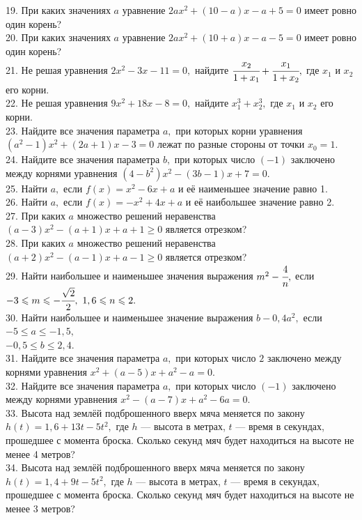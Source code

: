 \documentclass[12pt]{article}
\begin{document}
19. При каких значениях $a$ уравнение $2ax^2+(10-a)x-a+5=0$ имеет ровно один корень?\\
20. При каких значениях $a$ уравнение $2ax^2+(10+a)x-a-5=0$ имеет ровно один корень?\\
21. Не решая уравнения $2x^2-3x-11=0,$ найдите $\cfrac{x_2}{1+x_1}+\cfrac{x_1}{1+x_2},$ где $x_1$ и $x_2$ его корни.\\
22. Не решая уравнения $9x^2+18x-8=0,$ найдите $x_1^3+x_2^3,$ где $x_1$ и $x_2$ его корни.\\
23. Найдите все значения параметра $a,$ при которых корни уравнения $(a^2-1)x^2+(2a+1)x-3=0$ лежат по разные стороны от точки $x_0=1.$\\
24. Найдите все значения параметра $b,$ при которых число $(-1)$ заключено между корнями уравнения $(4-b^2)x^2-(3b-1)x+7=0.$\\
25. Найти $a,$ если $f(x)=x^2-6x+a$ и её наименьшее значение равно 1.\\
26. Найти $a,$ если $f(x)=-x^2+4x+a$ и её наибольшее значение равно 2.\\
27. При каких $a$ множество решений неравенства $(a-3)x^2-(a+1)x+a+1\geqslant0$ является отрезком?\\
28. При каких $a$ множество решений неравенства $(a+2)x^2-(a-1)x+a-1\geqslant0$ является отрезком?\\
29. Найти наибольшее и наименьшее значения выражения $m^2-\cfrac{4}{n},$ если $-3\leqslant m\leqslant-\cfrac{\sqrt{2}}{2},\ 1,6\leqslant n\leqslant 2.$\\
30. Найти наибольшее и наименьшее значение выражения $b-0,4a^2,$ если $-5\leqslant a\leqslant-1,5,$\\$-0,5\leqslant b\leqslant2,4.$\\
31. Найдите все значения параметра $a,$ при которых число $2$ заключено между корнями уравнения $x^2+(a-5)x+a^2-a=0.$\\
32. Найдите все значения параметра $a,$ при которых число $(-1)$ заключено между корнями уравнения $x^2-(a-7)x+a^2-6a=0.$\\
33. Высота над землёй подброшенного вверх мяча меняется по закону $h(t)=1,6+13t-5t^2,$ где $h$ --- высота в метрах, $t$ --- время в секундах, прошедшее с момента броска. Сколько секунд мяч будет находиться на высоте не менее 4 метров?\\
34. Высота над землёй подброшенного вверх мяча меняется по закону $h(t)=1,4+9t-5t^2,$ где $h$ --- высота в метрах, $t$ --- время в секундах, прошедшее с момента броска. Сколько секунд мяч будет находиться на высоте не менее 3 метров?\\
\end{document}
